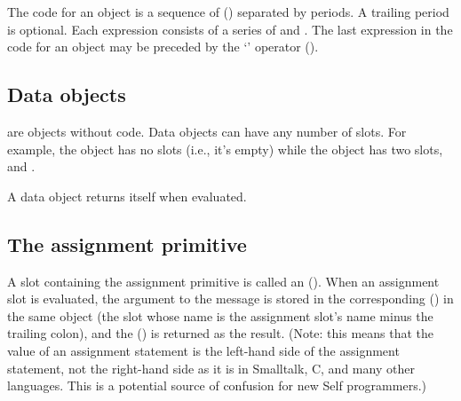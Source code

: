 \documentclass[letterpaper,10pt,english]{sphinxmanual}
\begin{document}
The code for an object is a sequence of  ({\hyperref[\detokenize{langref:pp-langref-expressions}]{}}) separated by periods. A trailing period
is optional. Each expression consists of a series of  and . The last expression
in the code for an object may be preceded by the ‘\sphinxcode{\textasciicircum{}}’ operator ({\hyperref[\detokenize{langref:pp-langref-returns}]{}}).


\subsection{Data objects}
\label{\detokenize{langref:index-5}}\label{\detokenize{langref:data-objects}}
 are objects without code. Data objects can have any number of slots. For example, the
object \sphinxcode{()} has no slots (i.e., it’s empty) while the object  has two slots,
 and .
\begin{figure}[htbp]
\centering

\noindent{}
\end{figure}

A data object returns itself when evaluated.


\subsection{The assignment primitive}
\label{\detokenize{langref:the-assignment-primitive}}\label{\detokenize{langref:index-10}}
A slot containing the assignment primitive is called an  ({\hyperref[\detokenize{langref:pp-read-write-slots}]{}}). When an assignment
slot is evaluated, the argument to the message is stored in the corresponding  ({\hyperref[\detokenize{langref:pp-langref-slot-descriptors}]{}})
in the same object (the slot whose name is the assignment slot’s name minus the trailing colon),
and the  ({\hyperref[\detokenize{langref:pp-implicit-receiver}]{}}) is returned as the result. (Note: this means that the value of an assignment
statement is the left-hand side of the assignment statement, not the right-hand side as it is in Smalltalk,
C, and many other languages. This is a potential source of confusion for new Self programmers.)
\end{document}
